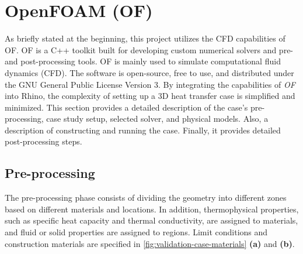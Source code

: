 \section[OpenFOAM]{OpenFOAM (OF)}
As briefly stated at the beginning, this project utilizes the CFD capabilities of  \gls{OF}.  \gls{OF} is a C++ toolkit built for developing custom numerical solvers and pre- and post-processing tools. \gls{OF} is mainly used to simulate computational fluid dynamics (CFD). The software is open-source, free to use, and distributed under the GNU General Public License Version 3.
By integrating the capabilities of \textit{OF} into Rhino, the complexity of setting up a 3D heat transfer case is simplified and minimized.
This section provides a detailed description of the case's pre-processing, case study setup, selected solver, and physical models. Also, a description of constructing and running the case. Finally, it provides detailed post-processing steps.



\subsection{Pre-processing}
The pre-processing phase consists of dividing the geometry into different zones based on different materials and locations. In addition, thermophysical properties, such as specific heat capacity and thermal conductivity, are assigned to materials, and fluid or solid properties are assigned to regions. Limit conditions and construction materials are specified in \cref{fig:validation-case-materials} \textbf{(a)} and \textbf{(b)}. 


